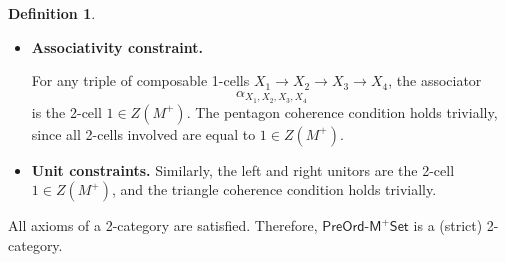 \documentclass[a4paper,10pt]{article}
\theoremstyle{plain}
\theoremstyle{definition}
\newtheorem{definition}[theorem]{Definition}
\theoremstyle{remark}
\begin{document}
\begin{definition}
\begin{itemize}
          \item \textbf{Associativity constraint.}

          For any triple of composable 1-cells
          $X_1 \to X_2 \to X_3 \to X_4$, the associator
          \[
            \alpha_{X_1,X_2,X_3,X_4}
          \]
          is the 2-cell $1 \in Z(M^+)$.
          The pentagon coherence condition holds trivially, since all 2-cells involved are equal to $1 \in Z(M^+)$.

    \item \textbf{Unit constraints.}
          Similarly, the left and right unitors are the 2-cell $1 \in Z(M^+)$, and the triangle coherence condition holds trivially.
  \end{itemize}
  All axioms of a 2-category are satisfied. Therefore, \(\mathsf{PreOrd\text{-}M^+Set}\) is a (strict) 2-category.  
\end{definition}
\end{document}
